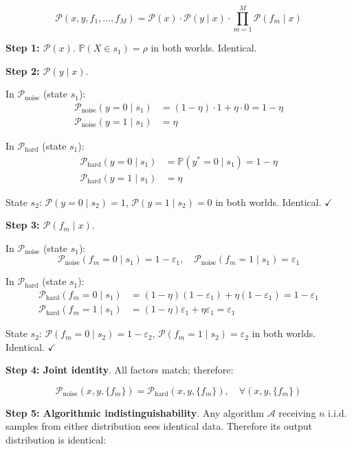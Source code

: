 \documentclass[
  12pt,
]{ctexart}
\begin{document}
\[\mathcal{P}(x, y, f_1, \dots, f_M) = \mathcal{P}(x) \cdot \mathcal{P}(y \mid x) \cdot \prod_{m=1}^M \mathcal{P}(f_m \mid x)\]

\textbf{Step 1: \(\mathcal{P}(x)\)}. \(\mathbb{P}(X \in s_1) = \rho\) in
both worlds. Identical.

\textbf{Step 2: \(\mathcal{P}(y \mid x)\)}.

In \(\mathcal{P}_{\text{noise}}\) (state \(s_1\)): \[\begin{aligned}
\mathcal{P}_{\text{noise}}(y = 0 \mid s_1) &= (1 - \eta) \cdot 1 + \eta \cdot 0 = 1 - \eta \\
\mathcal{P}_{\text{noise}}(y = 1 \mid s_1) &= \eta
\end{aligned}\]

In \(\mathcal{P}_{\text{hard}}\) (state \(s_1\)): \[\begin{aligned}
\mathcal{P}_{\text{hard}}(y = 0 \mid s_1) &= \mathbb{P}(y^* = 0 \mid s_1) = 1 - \eta \\
\mathcal{P}_{\text{hard}}(y = 1 \mid s_1) &= \eta
\end{aligned}\]

State \(s_2\): \(\mathcal{P}(y = 0 \mid s_2) = 1\),
\(\mathcal{P}(y = 1 \mid s_2) = 0\) in both worlds. Identical.
\(\checkmark\)

\textbf{Step 3: \(\mathcal{P}(f_m \mid x)\)}.

In \(\mathcal{P}_{\text{noise}}\) (state \(s_1\)):
\[\mathcal{P}_{\text{noise}}(f_m = 0 \mid s_1) = 1 - \varepsilon_1, \quad \mathcal{P}_{\text{noise}}(f_m = 1 \mid s_1) = \varepsilon_1\]

In \(\mathcal{P}_{\text{hard}}\) (state \(s_1\)): \[\begin{aligned}
\mathcal{P}_{\text{hard}}(f_m = 0 \mid s_1) &= (1-\eta)(1-\varepsilon_1) + \eta(1-\varepsilon_1) = 1 - \varepsilon_1 \\
\mathcal{P}_{\text{hard}}(f_m = 1 \mid s_1) &= (1-\eta)\varepsilon_1 + \eta\varepsilon_1 = \varepsilon_1
\end{aligned}\]

State \(s_2\): \(\mathcal{P}(f_m = 0 \mid s_2) = 1 - \varepsilon_2\),
\(\mathcal{P}(f_m = 1 \mid s_2) = \varepsilon_2\) in both worlds.
Identical. \(\checkmark\)

\textbf{Step 4: Joint identity}. All factors match; therefore:

\[\mathcal{P}_{\text{noise}}(x, y, \{f_m\}) = \mathcal{P}_{\text{hard}}(x, y, \{f_m\}), \quad \forall (x, y, \{f_m\})\]

\textbf{Step 5: Algorithmic indistinguishability}. Any algorithm
\(\mathcal{A}\) receiving \(n\) i.i.d. samples from either distribution
sees identical data. Therefore its output distribution is identical:
\end{document}
